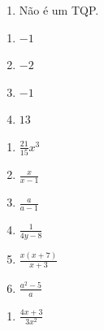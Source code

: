 \begin{description}
\begin{enumerate}[label=\thesection.4.\arabic*]
\begin{multicols}{2}
\begin{enumerate}[label=\alph*)]
                \item Não é um TQP.
            \end{enumerate}
        \end{multicols}

        \ansitem{} \begin{multicols}{4}
            \begin{enumerate}[label=\alph*)]
                \item $-1$
                
                \item $-2$
                
                \item $-1$
                
                \item $13$
            \end{enumerate}
        \end{multicols}
        
    \end{enumerate}
    \begin{enumerate}[label=\thesection.5.\arabic*]
        
        \ansitem{} \begin{multicols}{3}
            \begin{enumerate}[label=\alph*)]
                \item $\frac{21}{15}x^3$
                
                \item $\frac{x}{x -1}$
                
                \item $\frac{a}{a-1}$
                
                \item $\frac{1}{4y-8}$
                
                \item $\frac{x(x+7)}{x+3}$
                
                \item $\frac{a^2-5}{a}$
            \end{enumerate}
        \end{multicols}
        
        \ansitem{} \begin{multicols}{3}
            \begin{enumerate}[label=\alph*)]
                \item $\frac{4x+3}{3x^2}$
                

\end{enumerate}
\end{multicols}
\end{enumerate}
\end{description}
